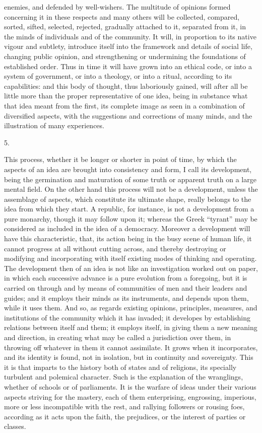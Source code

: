enemies, and defended by well-wishers. The multitude of
opinions formed concerning it in these respects and many
others will be collected, compared, sorted, sifted,
selected, rejected, gradually attached to it, separated
from it, in the minds of individuals and of the
community. It will, in proportion to its native vigour
and subtlety, introduce itself into the framework and
details of social life, changing public opinion, and
strengthening or undermining the foundations of
established order. Thus in time it will have grown into
an ethical code, or into a system of government, or into
a theology, or into a ritual, according to its
capabilities: and this body of thought, thus laboriously
gained, will after all be little more than the proper
representative of one idea, being in substance what that
idea meant from the first, its complete image as seen in
a combination of diversified aspects, with the
suggestions and corrections of many minds, and the
illustration of many experiences.

5.

This process, whether it be longer or shorter in point
of time, by which the aspects of an idea are brought into
consistency and form, I call its development, being the
germination and maturation of some truth or apparent
truth on a large mental field. On the other hand this
process will not be a development, unless the assemblage
of aspects, which constitute its ultimate shape, really
belongs to the idea from which they start. A republic,
for instance, is not a development from a pure monarchy,
though it may follow upon it; whereas the Greek
``tyrant'' may be considered as included in the
idea of a democracy. Moreover a development will have
this characteristic, that, its action being in the busy
scene of human life, it cannot progress at all without
cutting across, and thereby destroying or modifying and
incorporating with itself existing modes of thinking and
operating. The development then of an idea is not like an
investigation worked out on paper, in which each
successive advance is a pure evolution from a foregoing,
but it is carried on through and by means of communities
of men and their leaders and guides; and it employs their
minds as its instruments, and depends upon them, while it
uses them. And so, as regards existing opinions,
principles, measures, and institutions of the community
which it has invaded; it developes by establishing relations between itself and them; it employs itself, in
giving them a new meaning and direction, in creating what
may be called a jurisdiction over them, in throwing off
whatever in them it cannot assimilate. It grows when it
incorporates, and its identity is found, not in
isolation, but in continuity and sovereignty. This it is
that imparts to the history both of states and of
religions, its specially turbulent and polemical
character. Such is the explanation of the wranglings,
whether of schools or of parliaments. It is the warfare
of ideas under their various aspects striving for the
mastery, each of them enterprising, engrossing,
imperious, more or less incompatible with the rest, and
rallying followers or rousing foes, according as it acts
upon the faith, the prejudices, or the interest of
parties or classes.

